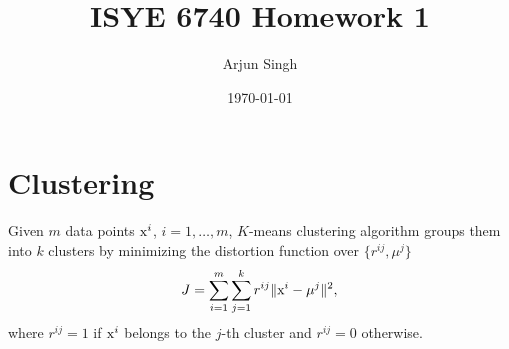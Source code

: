 \documentclass[twoside,10pt]{article}
\begin{document}
\title{ISYE 6740 Homework 1}
\author{Arjun Singh}
\date{\today}
\maketitle



\section{Clustering}



Given $m$ data points $\text x^i$, $i=1,\dots, m$, $K$-means clustering algorithm groups them into $k$ clusters by minimizing the distortion function over $\{ r^{ij}, \mu^j \}$
$$J=\sum_{i=1}^m\sum_{j=1}^k r^{ij} \|\text x^i-\mu^j\|^2,$$
where $r^{ij}=1$ if $\text x^i$ belongs to the $j$-th cluster and $r^{ij}=0$ otherwise.
\end{document}
